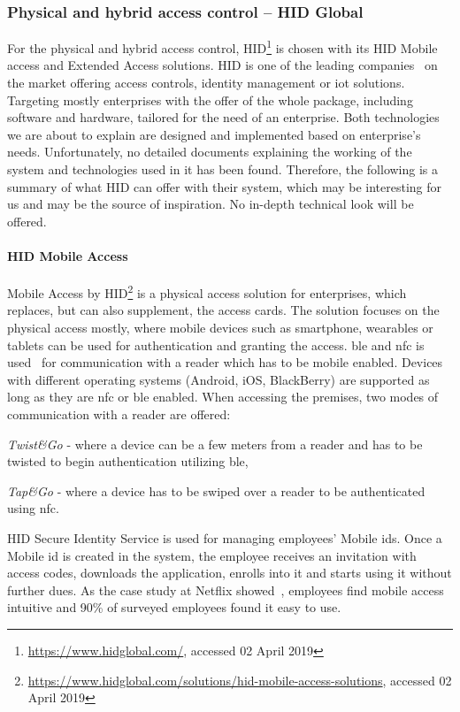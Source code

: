 \subsubsection{Physical and hybrid access control -- HID Global} \label{sec:pacs-hid}

For the physical and hybrid access control, HID\footnote{\url{https://www.hidglobal.com/}, accessed 02 April 2019} is chosen with its HID Mobile access and Extended Access solutions. HID is one of the leading companies~\cite{TopManufacturers} on the market offering access controls, identity management or \acrshort{iot} solutions. Targeting mostly enterprises with the offer of the whole package, including software and hardware, tailored for the need of an enterprise. Both technologies we are about to explain are designed and implemented based on enterprise’s needs. Unfortunately, no detailed documents explaining the working of the system and technologies used in it has been found. Therefore, the following is a summary of what HID can offer with their system, which may be interesting for us and may be the source of inspiration. No in-depth technical look will be offered.

\paragraph{HID Mobile Access}
Mobile Access by HID\footnote{\url{https://www.hidglobal.com/solutions/hid-mobile-access-solutions}, accessed 02 April 2019} is a physical access solution for enterprises, which replaces, but can also supplement, the access cards. The solution focuses on the physical access mostly, where mobile devices such as smartphone, wearables or tablets can be used for authentication and granting the access. \acrshort{ble} and \acrshort{nfc} is used~\cite{HIDGlobal2014HIDGlobal} for communication with a reader which has to be mobile enabled. Devices with different operating systems (Android, iOS, BlackBerry) are supported as long as they are \acrshort{nfc} or \acrshort{ble} enabled. When accessing the premises, two modes of communication with a reader are offered: 
%
\begin{enumerate*}[label=(\roman*)]
    \item \textit{Twist\&Go} - where a device can be a few meters from a reader and has to be twisted to begin authentication utilizing \acrshort{ble},
    \item \textit{Tap\&Go} - where a device has to be swiped over a reader to be authenticated using \acrshort{nfc}.
\end{enumerate*}
%
HID Secure Identity Service is used for managing employees’ Mobile \acrshort{id}s. Once a Mobile \acrshort{id} is created in the system, the employee receives an invitation with access codes, downloads the application, enrolls into it and starts using it without further dues. As the case study at Netflix showed~\cite{2012NetflixPilot}, employees find mobile access intuitive and 90\% of surveyed employees found it easy to use.

